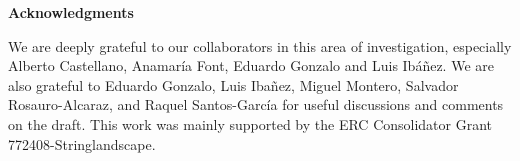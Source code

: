 \documentclass[11pt,a4paper]{article}
\begin{document}

 \vspace{5mm}
{\bf \large Acknowledgments}

\noindent We are deeply grateful to our collaborators in this area of investigation, especially Alberto Castellano, Anamar\'ia Font, Eduardo Gonzalo and Luis Ib\'a\~nez. We are also grateful to Eduardo Gonzalo, Luis Iba\~nez, Miguel Montero, Salvador Rosauro-Alcaraz, and Raquel Santos-Garc\'ia for useful discussions and comments on the draft. This work was mainly supported by the ERC Consolidator Grant 772408-Stringlandscape. 


\bigskip


\noindent



\fontsize{11}{12}\selectfont




\end{document}
